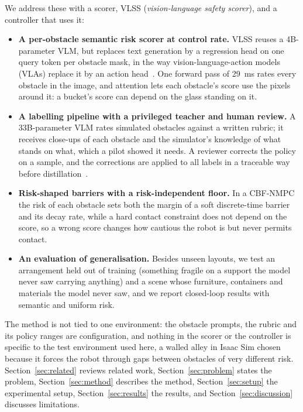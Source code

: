 \documentclass[10pt,a4paper]{article}
\begin{document}
We address these with a scorer, VLSS (\emph{vision-language safety scorer}), and a controller that uses it:
\begin{itemize}
\item \textbf{A per-obstacle semantic risk scorer at control rate.} VLSS reuses a 4B-parameter VLM, but replaces text generation
by a regression head on one query token per obstacle mask, in the way vision-language-action models (VLAs) replace it by an action
head~\cite{zitkovich2023rt2,kim2024openvla}. One forward pass of 29~ms rates every obstacle in the image, and attention lets each
obstacle's score use the pixels around it: a bucket's score can depend on the glass standing on it.
\item \textbf{A labelling pipeline with a privileged teacher and human review.} A 33B-parameter VLM rates simulated obstacles
against a written rubric; it receives close-ups of each obstacle and the simulator's knowledge of what stands on what, which a
pilot showed it needs. A reviewer corrects the policy on a sample, and the corrections are applied to all labels in a traceable
way before distillation~\cite{hinton2015distilling}.
\item \textbf{Risk-shaped barriers with a risk-independent floor.} In a CBF-NMPC the risk of each obstacle sets both the margin of
a soft discrete-time barrier and its decay rate, while a hard contact constraint does not depend on the score, so a wrong score
changes how cautious the robot is but never permits contact.
\item \textbf{An evaluation of generalisation.} Besides unseen layouts, we test an arrangement held out of training (something
fragile on a support the model never saw carrying anything) and a scene whose furniture, containers and materials the model never
saw, and we report closed-loop results with semantic and uniform risk.
\end{itemize}

The method is not tied to one environment: the obstacle prompts, the rubric and its policy ranges are configuration, and nothing
in the scorer or the controller is specific to the test environment used here, a walled alley in Isaac Sim chosen because it forces
the robot through gaps between obstacles of very different risk. Section~\ref{sec:related} reviews related work,
Section~\ref{sec:problem} states the problem, Section~\ref{sec:method} describes the method, Section~\ref{sec:setup} the
experimental setup, Section~\ref{sec:results} the results, and Section~\ref{sec:discussion} discusses limitations.
\end{document}
